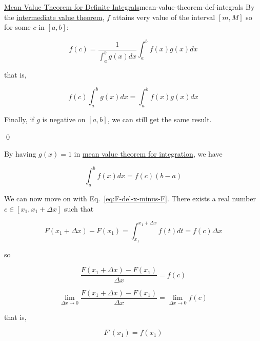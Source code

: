\begin{Theorem}{\href{https://en.wikipedia.org/wiki/Mean\_value\_theorem\#First\_mean\_value\_theorem\_for\_definite\_integrals}{Mean Value Theorem for Definite Integrals}}{mean-value-theorem-def-integrals}
    By the \href{https://en.wikipedia.org/wiki/Intermediate\_value\_theorem}{intermediate value theorem}, $f$ attains
    very value of the interval $[m, M]$ so for some $c$ in $[a, b]$:

    \begin{equation}
        f(c) = \frac{1}{\int_a^b g(x)dx}\int_a^b f(x)g(x)dx
    \end{equation}

    that is,

    \begin{equation}
        f(c)\int_a^b g(x)dx = \int_a^b f(x)g(x)dx
    \end{equation}

    Finally, if $g$ is negative on $[a, b]$, we can still get the same result.

    \qed

\end{Theorem}

By having $g(x) = 1$ in \hyperref[theo:mean-value-theorem-def-integrals]{mean value theorem for integration}, we have

\begin{equation}
    \int_a^b f(x)dx = f(c)(b - a)
\end{equation}

We can now move on with Eq.~\ref{eq:F-del-x-minus-F}. There exists a real number $c \in [x_1, x_1 + \Delta x]$ such that

\begin{equation}
    F(x_1 + \Delta x) - F(x_1) = \int_{x_1}^{x_1 + \Delta x} f(t)dt = f(c)\Delta x
\end{equation}

so

\begin{equation}
    \frac{F(x_1 + \Delta x) - F(x_1)}{\Delta x} = f(c)
\end{equation}

\begin{equation}
    \lim\limits_{\Delta x \rightarrow 0}\frac{F(x_1 + \Delta x) - F(x_1)}{\Delta x} = \lim\limits_{\Delta x \rightarrow 0} f(c)
\end{equation}

that is,

\begin{equation}
    F'(x_1) = f(x_1)
\end{equation}

